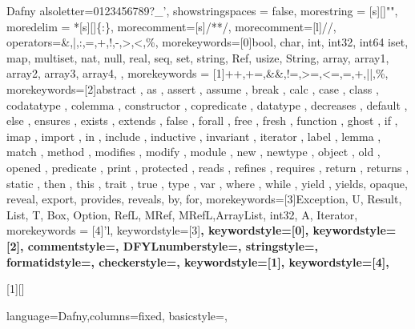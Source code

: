 \makeatother


\lstdefinelanguage
{Dafny}
{
	alsoletter={0123456789?_'},
	showstringspaces = false,
	morestring = [s][\instringtrue\color{DFYLstringColor}]{"}{"},
	moredelim = *[s][\inbracetrue]{\{:}{\}},
	morecomment=[s]{/*}{*/},
	morecomment=[l]//,
	operators={&,|,:,=,+,!,-,>,<,\%},
	morekeywords=[0]{bool, char, int, int32, int64 iset, map, multiset, 
		nat, null, real, seq, set,
		string, Ref, usize, String,
		array, array1, array2, array3, array4, %
		},
	morekeywords = [1]{++,+=,&&,!=,>=,<=,=,+,||,\%},
	morekeywords=[2]{abstract , as , assert , assume , break ,
		calc , case , class , codatatype , colemma ,
		constructor , copredicate , datatype , decreases ,
		default , else , ensures , exists , extends , false ,
		forall , free , fresh , function , ghost , if , imap , import ,
		in , include , inductive , invariant , iterator , label ,
		lemma , match , method , modifies , modify ,
		module , new , newtype , object ,
		old , opened , predicate , print , protected ,
		reads , refines , requires , return , returns , 
		static , then , this , trait , true , type ,
		var , where , while , yield , yields, opaque, reveal,
	    export, provides, reveals, by, for},  %
    morekeywords=[3]{Exception, U, Result, List, T, Box, 
    Option, RefL, MRef, MRefL,ArrayList,  
    int32, A, Iterator}, %
    morekeywords = [4]{'l},
    keywordstyle=[3]\bfseries\color{DFYLKWColor},
	keywordstyle=[0]\bfseries\color{DFYLKWColor},
	keywordstyle=[2]\bfseries\color{DFYLKW2Color},
	commentstyle=\color{DFYLcommentColor},
	DFYLnumberstyle=\color{DFYLnumberColor},
	stringstyle=\color{DFYLstringColor},
	formatidstyle=\color{DFYLnumberColor},
	checkerstyle=\color{DFYLcheckerColor},
	keywordstyle=[1]\color{DFYLoperatorColor},
	keywordstyle=[4]\color{DFYLstringColor},
}

[1][]{
	\lstset{ %
		basicstyle=\ttfamily,
		breakatwhitespace=true,
		breaklines=true,
		extendedchars=true,
		keepspaces=true,
		showspaces=false,
		showstringspaces=false,
		showtabs=false,
		tabsize=2,
		language=Dafny,
		#1
	}\DFYLparsenumberstrue
}{\DFYLparsenumbersfalse}

{
	language=Dafny,columns=fixed,
	basicstyle={\ttfamily},
}
